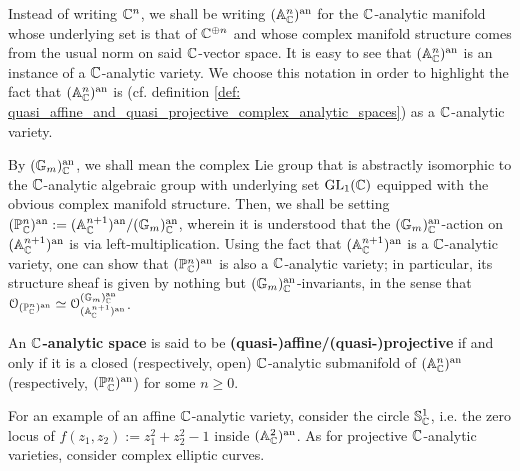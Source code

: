             \begin{convention} \label{conv: complex_analytic_affine_and_projective_spaces}
                Instead of writing $\mathbb{C}^n$, we shall be writing $(\mathbb{A}^n_{\mathbb{C}})^{\mathrm{an}}$ for the $\mathbb{C}$-analytic manifold whose underlying set is that of $\mathbb{C}^{\oplus n}$ and whose complex manifold structure comes from the usual norm on said $\mathbb{C}$-vector space. It is easy to see that $(\mathbb{A}^n_{\mathbb{C}})^{\mathrm{an}}$ is an instance of a $\mathbb{C}$-analytic variety. We choose this notation in order to highlight the fact that $(\mathbb{A}^n_{\mathbb{C}})^{\mathrm{an}}$ is  (cf. definition \ref{def: quasi_affine_and_quasi_projective_complex_analytic_spaces}) as a $\mathbb{C}$-analytic variety. 
                
                By $(\mathbb{G}_m)_{\mathbb{C}}^{\mathrm{an}}$, we shall mean the complex Lie group that is abstractly isomorphic to the $\mathbb{C}$-analytic algebraic group with underlying set $\operatorname{GL}_1(\mathbb{C})$ equipped with the obvious complex manifold structure. Then, we shall be setting $(\mathbb{P}^n_{\mathbb{C}})^{\mathrm{an}} := (\mathbb{A}^{n + 1}_{\mathbb{C}})^{\mathrm{an}}/(\mathbb{G}_m)_{\mathbb{C}}^{\mathrm{an}}$, wherein it is understood that the $(\mathbb{G}_m)_{\mathbb{C}}^{\mathrm{an}}$-action on $(\mathbb{A}^{n + 1}_{\mathbb{C}})^{\mathrm{an}}$ is via left-multiplication. Using the fact that $(\mathbb{A}^{n + 1}_{\mathbb{C}})^{\mathrm{an}}$ is a $\mathbb{C}$-analytic variety, one can show that $(\mathbb{P}^n_{\mathbb{C}})^{\mathrm{an}}$ is also a $\mathbb{C}$-analytic variety; in particular, its structure sheaf is given by nothing but $(\mathbb{G}_m)_{\mathbb{C}}^{\mathrm{an}}$-invariants, in the sense that $\mathcal{O}_{(\mathbb{P}^n_{\mathbb{C}})^{\mathrm{an}}} \simeq \mathcal{O}_{(\mathbb{A}^{n + 1}_{\mathbb{C}})^{\mathrm{an}}}^{(\mathbb{G}_m)_{\mathbb{C}}^{\mathrm{an}}}$.
            \end{convention}
            \begin{definition} \label{def: quasi_affine_and_quasi_projective_complex_analytic_spaces}
                An \textbf{$\mathbb{C}$-analytic space} is said to be \textbf{(quasi-)affine/(quasi-)projective} if and only if it is a closed (respectively, open) $\mathbb{C}$-analytic submanifold of $(\mathbb{A}^n_{\mathbb{C}})^{\mathrm{an}}$ (respectively, $(\mathbb{P}^n_{\mathbb{C}})^{\mathrm{an}}$) for some $n \geq 0$.
            \end{definition}
            \begin{example}
                For an example of an affine $\mathbb{C}$-analytic variety, consider the circle $\mathbb{S}^1_{\mathbb{C}}$, i.e. the zero locus of $f(z_1, z_2) := z_1^2 + z_2^2 - 1$ inside $(\mathbb{A}^2_{\mathbb{C}})^{\mathrm{an}}$. As for projective $\mathbb{C}$-analytic varieties, consider complex elliptic curves. 
            \end{example}
